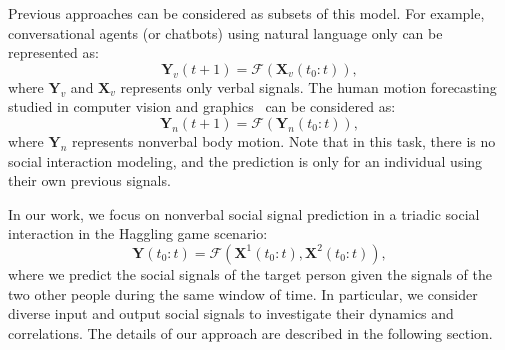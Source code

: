 Previous approaches can be considered as subsets of this model. For example, conversational agents (or chatbots) using natural language only can be represented as:
\begin{equation}
\mathbf{Y}_v (t+1) =  \mathcal{F} \left( \mathbf{X}_v (t_0:t) \right),
\end{equation}
where $\mathbf{Y}_v$ and $\mathbf{X}_v$ represents only verbal signals. The human motion forecasting studied in computer vision and graphics~\cite{Fragkiadaki_2015_ICCV, jain2016structural} can be considered as:
\begin{equation}
\mathbf{Y}_n (t+1) =  \mathcal{F} \left( \mathbf{Y}_n (t_0:t) \right),
\end{equation}
where $\mathbf{Y}_n$ represents nonverbal body motion. Note that in this task, there is no social interaction modeling, and the prediction is only for an individual using their own previous signals. 

In our work, we focus on nonverbal social signal prediction in a triadic social interaction in the Haggling game scenario:
\begin{equation}
\mathbf{Y} ( t_0:t ) =  \mathcal{F} \left( \mathbf{X}^1 (t_0:t), \mathbf{X}^2 (t_0:t) \right),
\label{equation:F_ours}
\end{equation}
where we predict the social signals of the target person given the signals of the two other people during the same window of time. In particular, we consider diverse input and output social signals to investigate their dynamics and correlations. The details of our approach are described in the following section.

